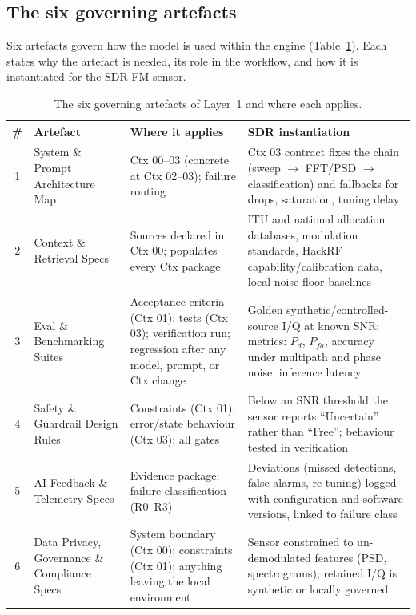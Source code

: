 \documentclass[11pt,a4paper]{article}
\begin{document}
\subsection{The six governing artefacts}
\label{sec:artefacts}

Six artefacts govern how the model is used within the engine
(Table~\ref{tab:artefacts}). Each states why the artefact is needed, its role in the workflow, and how
it is instantiated for the SDR FM sensor.

\begin{table}[htbp]
\centering
\caption{The six governing artefacts of Layer~1 and where each applies.}
\label{tab:artefacts}
\small
\setlength{\tabcolsep}{5pt}
\begin{tabular}{@{}clp{4.4cm}p{6.2cm}@{}}
\toprule
\textbf{\#} & \textbf{Artefact} & \textbf{Where it applies} & \textbf{SDR instantiation} \\
\midrule
1 & System \& Prompt Architecture Map & Ctx 00--03 (concrete at Ctx 02--03); failure routing & Ctx 03 contract fixes the chain (sweep $\rightarrow$ FFT/PSD $\rightarrow$ classification) and fallbacks for drops, saturation, tuning delay \\
2 & Context \& Retrieval Specs & Sources declared in Ctx 00; populates every Ctx package & ITU and national allocation databases, modulation standards, HackRF capability/calibration data, local noise-floor baselines \\
3 & Eval \& Benchmarking Suites & Acceptance criteria (Ctx 01); tests (Ctx 03); verification run; regression after any model, prompt, or Ctx change & Golden synthetic/controlled-source I/Q at known SNR; metrics: $P_d$, $P_{fa}$, accuracy under multipath and phase noise, inference latency \\
4 & Safety \& Guardrail Design Rules & Constraints (Ctx 01); error/state behaviour (Ctx 03); all gates & Below an SNR threshold the sensor reports ``Uncertain'' rather than ``Free''; behaviour tested in verification \\
5 & AI Feedback \& Telemetry Specs & Evidence package; failure classification (R0--R3) & Deviations (missed detections, false alarms, re-tuning) logged with configuration and software versions, linked to failure class \\
6 & Data Privacy, Governance \& Compliance Specs & System boundary (Ctx 00); constraints (Ctx 01); anything leaving the local environment & Sensor constrained to un-demodulated features (PSD, spectrograms); retained I/Q is synthetic or locally governed \\
\bottomrule
\end{tabular}
\end{table}
\end{document}
